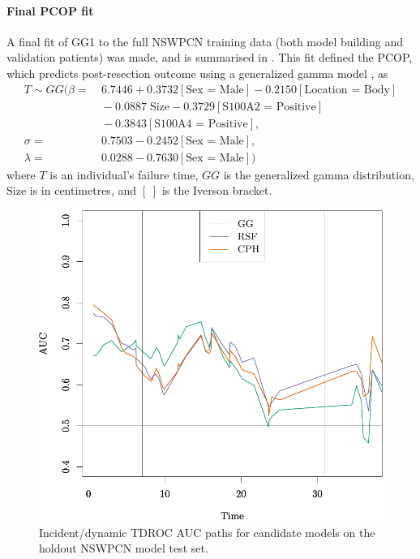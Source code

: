 \documentclass[dissertation.tex]{subfiles}
\begin{document}
\paragraph{Final \acrshort{PCOP} fit}
A final fit of GG1 to the full \gls{NSWPCN} training data (both model building and validation patients) was made, and is summarised in .  This fit defined the \gls{PCOP}, which predicts post-resection outcome using a generalized gamma model \cite{Cox2007}, as
\begin{align*}
T \sim GG(\beta   = &\ 6.7446 + 0.3732[\mbox{Sex = Male}] - 0.2150[\mbox{Location = Body}] \\
                    &\ -0.0887\;\mbox{Size} - 0.3729[\mbox{S100A2 = Positive}] \\
                    &\ -0.3843[\mbox{S100A4 = Positive}], \\ 
          \sigma  = &\ 0.7503 - 0.2452[\mbox{Sex = Male}],\\
          \lambda = &\ 0.0288 - 0.7630[\mbox{Sex = Male}])
\end{align*}
where $T$ is an individual's failure time, $GG$ is the generalized gamma distribution, $\mbox{Size}$ is in centimetres, and $[\;]$ is the Iverson bracket.

\begin{figure}
\centering
  \includegraphics[width=.7\linewidth]{analysis/nomogram/figure/05-model-selection-roc-id-1}
  \caption[Time-dependent \acrshort{AUC} paths for candidate models on holdout data]{Incident/dynamic \gls{TDROC} \gls{AUC} paths for candidate models on the holdout \gls{NSWPCN} model test set.}
\label{fig:nomo-tdauc-paths}
\end{figure}
\end{document}
